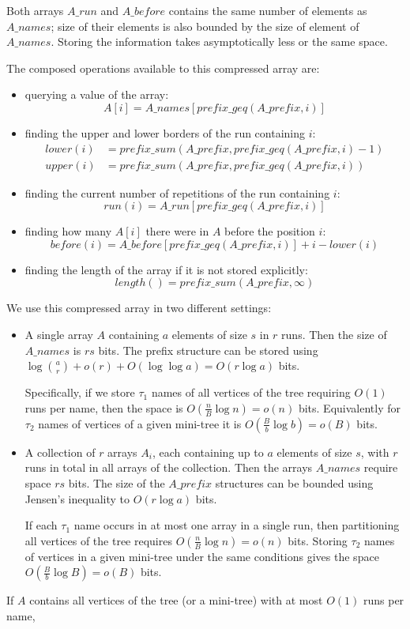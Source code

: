 Both arrays $A\_run$ and $A\_before$ contains the same number of elements as $A\_names$; size of their elements is also bounded by the size of element of $A\_names$.
Storing the information takes asymptotically less or the same space.

The composed operations available to this compressed array are:
\begin{itemize}
	\item querying a value of the array:
		$$A[i] = A\_names[prefix\_geq(A\_prefix, i)]$$
	\item finding the upper and lower borders of the run containing $i$: 
	\begin{align*}
		lower(i) &= prefix\_sum(A\_prefix, prefix\_geq(A\_prefix, i) - 1) \\
		upper(i) &= prefix\_sum(A\_prefix, prefix\_geq(A\_prefix, i))
	\end{align*} 
	\item finding the current number of repetitions of the run containing $i$:
	$$ run(i) = A\_run[prefix\_geq(A\_prefix, i)] $$
	\item finding how many $A[i]$ there were in $A$ before the position $i$:
	$$ before(i) = A\_before[prefix\_geq(A\_prefix, i)] + i - lower(i) $$
	\item finding the length of the array if it is not stored explicitly:
	$$ length() = prefix\_sum(A\_prefix, \infty)$$
\end{itemize}

We use this compressed array in two different settings:
\begin{itemize}
	\item A single array $A$ containing $a$ elements of size $s$ in $r$ runs.
	Then the size of $A\_names$ is $r s$ bits.
	The prefix structure can be stored using $\log {a \choose r} + o(r) + O(\log \log a) = O(r \log a)$ bits.
	
	Specifically, if we store $\tau_1$ names of all vertices of the tree requiring $O(1)$ runs per name, then the space is $O(\frac{n}{B} \log n) = o(n)$ bits.
	Equivalently for $\tau_2$ names of vertices of a given mini-tree it is $O(\frac{B}{b} \log b) = o(B)$ bits.
	\item A collection of $r$ arrays $A_i$, each containing up to $a$ elements of size $s$, with $r$ runs in total in all arrays of the collection.
	Then the arrays $A\_names$ require space $r s$ bits.
	The size of the $A\_prefix$ structures can be bounded using Jensen's inequality to $O(r \log a)$ bits.
	
	If each $\tau_1$ name occurs in at most one array in a single run, then partitioning all vertices of the tree requires $O(\frac{n}{B} \log n) = o(n)$ bits.
	Storing $\tau_2$ names of vertices in a given mini-tree under the same conditions gives the space $O(\frac{B}{b} \log B) = o(B)$ bits.
\end{itemize}
If $A$ contains all vertices of the tree (or a mini-tree) with at most $O(1)$ runs per name, 


